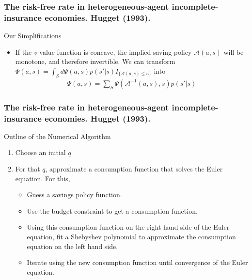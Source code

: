 \documentclass{beamer}
\begin{document}
\frame
{
  \frametitle{  The risk-free rate in heterogeneous-agent incomplete-insurance economies. Hugget (1993).}
  Our Simplifications
  \begin{itemize}
	\item  If the $v$ value function is concave, the implied saving policy $\mathcal{A}(a,s)$ will be monotone, and therefore invertible. We can 	transform  $\Psi(a,s) = \int_S d\Psi(a,s) p(s' \vert s) I_{\{\mathcal{A}(a,s) \le a\}}$ into
	\begin{eqnarray*}
		\Psi(a,s) = \sum_S \Psi(\mathcal{A}^{-1}(a,s),s) p(s' \vert s)
	\end{eqnarray*}
\end{itemize}
}

\frame
{
  \frametitle{  The risk-free rate in heterogeneous-agent incomplete-insurance economies. Hugget (1993).}
Outline of the Numerical Algorithm 
  \begin{enumerate}
  \item Choose an initial $q$
  
  \item For that $q$, approximate a consumption function that solves the Euler equation. For this, 
  
  \begin{itemize}
	  \item Guess a savings policy function.
	  \item Use the budget constraint to get a consumption function. 
	  \item Using this consumption function on the right hand side of the Euler equation, fit a Shebyshev polynomial to 
	  approximate the consumption equation on the left hand side.
	  \item Iterate using the new consumption function until convergence of the Euler equation. 
  \end{itemize}
  
  \end{enumerate}
}
\end{document}
